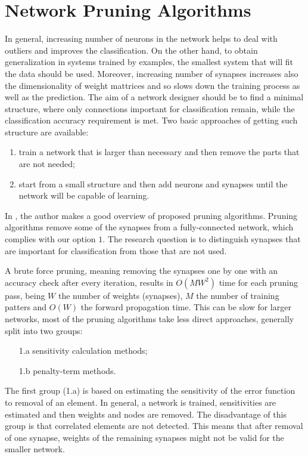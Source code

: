 \section{Network Pruning Algorithms} \label{sec:soa_pruning_algorithms}
In general, increasing number of neurons in the network helps to deal with outliers and improves the classification. On the other hand, to obtain generalization in systems trained by examples, the smallest system that will fit the data should be used. Moreover, increasing number of synapses increases also the dimensionality of weight mattrices and so slows down the training process as well as the prediction. The aim of a network designer should be to find a minimal structure, where only connections important for classification remain, while the classification accuracy requirement is met. Two basic approaches of getting such structure are available:

\begin{enumerate}
\item train a network that is larger than necessary and then remove the parts that are not needed;
\item start from a small structure and then add neurons and synapses until the network will be capable of learning.
\end{enumerate}

In \citep{article:10:pa}, the author makes a good overview of proposed pruning algorithms. Pruning algorithms remove some of the synapses from a fully-connected network, which complies with our option $ 1 $. The research question is to distinguish synapses that are important for classification from those that are not used.

A brute force pruning, meaning removing the synapses one by one with an accuracy check after every iteration, results in $ O(MW^2) $ time for each pruning pass, being $ W $ the number of weights (synapses), $ M $ the number of training patters and $ O(W) $ the forward propagation time. This can be slow for larger networks, most of the pruning algorithms take less direct approaches, generally split into two groups:

\begin{enumerate}
\item[1.a] sensitivity calculation methods;
\item[1.b] penalty-term methods.
\end{enumerate}

The first group (1.a) is based on estimating the sensitivity of the error function to removal of an element. In general, a network is trained, sensitivities are estimated and then weights and nodes are removed. The disadvantage of this group is that correlated elements are not detected. This means that after removal of one synapse, weights of the remaining synapses might not be valid for the smaller network.

